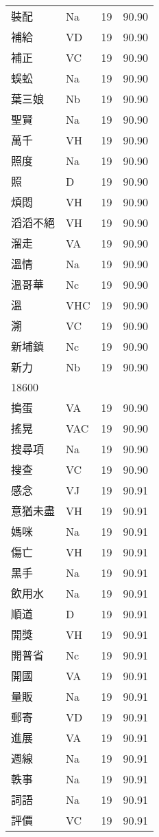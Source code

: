 \documentclass[twocolumn]{book}
\begin{document}
\begin{supertabular}{llrr}
裝配 & Na & 19 &  90.90\\
補給 & VD & 19 &  90.90\\
補正 & VC & 19 &  90.90\\
蜈蚣 & Na & 19 &  90.90\\
葉三娘 & Nb & 19 &  90.90\\
聖賢 & Na & 19 &  90.90\\
萬千 & VH & 19 &  90.90\\
照度 & Na & 19 &  90.90\\
照 & D & 19 &  90.90\\
煩悶 & VH & 19 &  90.90\\
滔滔不絕 & VH & 19 &  90.90\\
溜走 & VA & 19 &  90.90\\
溫情 & Na & 19 &  90.90\\
溫哥華 & Nc & 19 &  90.90\\
溫 & VHC & 19 &  90.90\\
溯 & VC & 19 &  90.90\\
新埔鎮 & Nc & 19 &  90.90\\
新力 & Nb & 19 &  90.90\\
18600\\
搗蛋 & VA & 19 &  90.90\\
搖晃 & VAC & 19 &  90.90\\
搜尋項 & Na & 19 &  90.90\\
搜查 & VC & 19 &  90.90\\
感念 & VJ & 19 &  90.91\\
意猶未盡 & VH & 19 &  90.91\\
媽咪 & Na & 19 &  90.91\\
傷亡 & VH & 19 &  90.91\\
黑手 & Na & 19 &  90.91\\
飲用水 & Na & 19 &  90.91\\
順道 & D & 19 &  90.91\\
開獎 & VH & 19 &  90.91\\
開普省 & Nc & 19 &  90.91\\
開國 & VA & 19 &  90.91\\
量販 & Na & 19 &  90.91\\
郵寄 & VD & 19 &  90.91\\
進展 & VA & 19 &  90.91\\
週線 & Na & 19 &  90.91\\
軼事 & Na & 19 &  90.91\\
詞語 & Na & 19 &  90.91\\
評價 & VC & 19 &  90.91\\

\end{supertabular}
\end{document}
